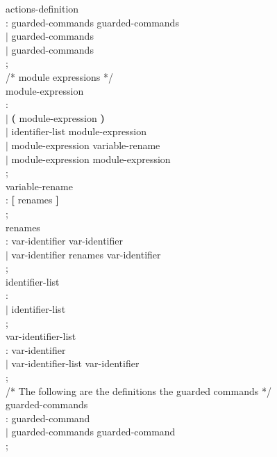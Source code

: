 \begin{tab}
\begin{tabbing}
actions-definition \\
\>: \INIT guarded-commands \UPDATE guarded-commands \\
\>$|$ \INIT \UPDATE guarded-commands \\
\>$|$ \UPDATE guarded-commands \\
\>; \\

/* module expressions */ \\

module-expression \\
\>: \MODULEID \\
\>$|$ {\bf (} module-expression {\bf )} \\
\>$|$ \HIDE identifier-list \IN module-expression \ENDHIDE \\
\>$|$ module-expression variable-rename \\
\>$|$ module-expression \PAR module-expression  \\
\>; \\

variable-rename  \\
\>: {\bf [} renames {\bf ]} \\
\>; \\

renames \\
\>: var-identifier \ASSIGN var-identifier \\
\>$|$ var-identifier \COMA renames \COMA var-identifier \\
\>; \\

identifier-list \\
\>: \IDENTIFIER \\
\>$|$ identifier-list \COMA \IDENTIFIER \\
\>; \\

var-identifier-list \\
\>: var-identifier  \\
\>$|$ var-identifier-list \COMA var-identifier \\
\>; \\
  
/* The following are the definitions the guarded commands */ \\

guarded-commands \\
\>: guarded-command \\
\>$|$ guarded-commands guarded-command \\
\>;  \\


\end{tabbing}
\end{tab}
